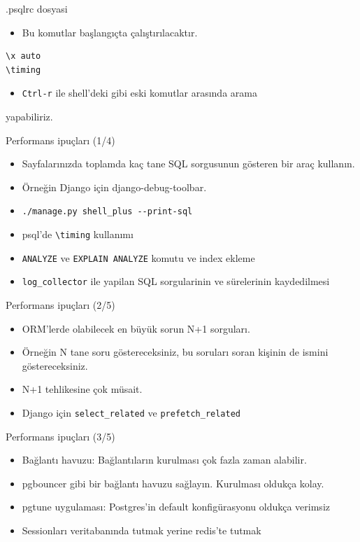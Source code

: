 \documentclass[presentation]{beamer}
\begin{document}
\begin{frame}[fragile,label=sec-12]{.psqlrc dosyasi}
 \begin{itemize}
\item Bu komutlar başlangıçta çalıştırılacaktır.
\end{itemize}

\begin{verbatim}
\x auto
\timing
\end{verbatim}

\begin{itemize}
\item \texttt{Ctrl-r} ile shell'deki gibi eski komutlar arasında arama
\end{itemize}
yapabiliriz.
\end{frame}

\begin{frame}[fragile,label=sec-13]{Performans ipuçları (1/4)}
 \begin{itemize}
\item Sayfalarınızda toplamda kaç tane SQL sorgusunun gösteren bir araç kullanın.
\item Örneğin Django için django-debug-toolbar.
\item \texttt{./manage.py shell\_plus -{}-print-sql}
\item psql'de \texttt{\textbackslash{}timing} kullanımı
\item \texttt{ANALYZE} ve \texttt{EXPLAIN ANALYZE} komutu ve index ekleme
\item \texttt{log\_collector} ile yapilan SQL sorgularinin ve sürelerinin kaydedilmesi
\end{itemize}
\end{frame}

\begin{frame}[fragile,label=sec-14]{Performans ipuçları (2/5)}
 \begin{itemize}
\item ORM'lerde olabilecek en büyük sorun N+1 sorguları.
\item Örneğin N tane soru göstereceksiniz, bu soruları soran kişinin de ismini
göstereceksiniz.
\item N+1 tehlikesine çok müsait.
\item Django için \texttt{select\_related} ve \texttt{prefetch\_related}
\end{itemize}
\end{frame}

\begin{frame}[label=sec-15]{Performans ipuçları (3/5)}
\begin{itemize}
\item Bağlantı havuzu: Bağlantıların kurulması çok fazla zaman alabilir.
\item pgbouncer gibi bir bağlantı havuzu sağlayın. Kurulması oldukça kolay.
\item pgtune uygulaması: Postgres'in default konfigürasyonu oldukça verimsiz
\item Sessionları veritabanında tutmak yerine redis'te tutmak
\end{itemize}
\end{frame}
\end{document}
